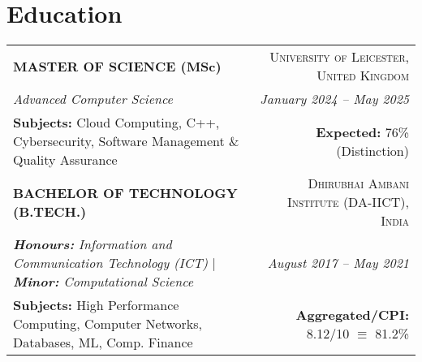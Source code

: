 \section{\Large Education}
\noindent
\begin{tabularx}{\textwidth}{@{}X r@{}}  
    \textbf{\uppercase{Master of Science} (MSc)} & \textsc{University of Leicester, United Kingdom} \\  
    \textit{Advanced Computer Science} & \textit{January 2024 – May 2025} \\
    \textbf{Subjects:} Cloud Computing, C++, Cybersecurity, Software Management \& Quality Assurance & \textbf{Expected:} 76\% (Distinction)\\
    [4pt]  
    \textbf{\uppercase{Bachelor of Technology (B.Tech.)}} & \textsc{Dhirubhai Ambani Institute (DA-IICT), India} \\  
    \textit{\textbf{Honours:} Information and Communication Technology (ICT)} \quad | \quad \textit{\textbf{Minor:} Computational Science} & \textit{August 2017 – May 2021} \\  
    \textbf{Subjects:} High Performance Computing, Computer Networks, Databases, ML, Comp. Finance & \textbf{Aggregated/CPI:} 8.12/10 $\equiv$ 81.2\% \\  
\end{tabularx}
